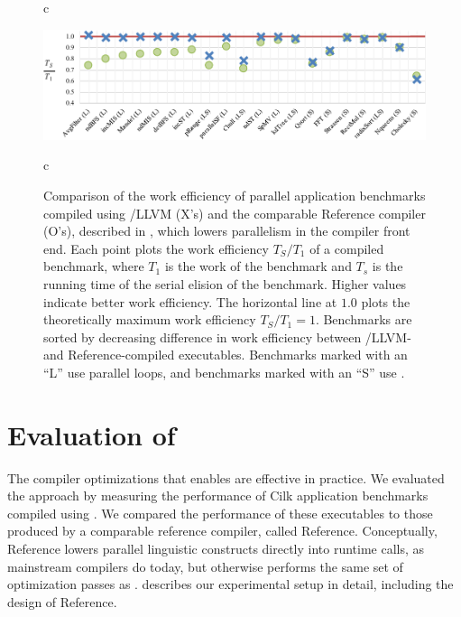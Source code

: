 \begin{figure}[t]
\begin{tab}{c}

\toprule
\end{tab}
  \begin{flushleft}
      \includegraphics[width=\linewidth]{figures/workeff_scatter.pdf}
  \end{flushleft}
  \vspace*{-5mm}
  \begin{tab}{c}
  \bottomrule
 \end{tab}
 \caption[Graph of work efficiency comparison between Reference and Tapir/LLVM.]{Comparison of the work efficiency of
   \protect{} parallel application benchmarks
   compiled using \tapir/LLVM (X's) and the comparable Reference
   compiler (O's), described in , which lowers
   parallelism in the compiler front end.  Each point plots the work
   efficiency $T_S/T_1$ of a compiled benchmark, where $T_1$ is the
   work of the benchmark and $T_s$ is the running time of the serial
   elision of the benchmark.  Higher values indicate better work
   efficiency.  The horizontal line at $1.0$ plots the theoretically
   maximum work efficiency $T_S/T_1 = 1$.  Benchmarks are sorted by
   decreasing difference in work efficiency between \tapir/LLVM- and
   Reference-compiled executables.  Benchmarks marked with an ``L''
   use parallel loops, and benchmarks marked with an ``S'' use
   \CilkSpawn.}
  \label{fig:work_efficiency}
\end{figure}

\section{Evaluation of \tapirllvm}

The compiler optimizations that \tapir enables are effective in
practice.  We evaluated the \tapir approach by measuring the
performance of  Cilk application benchmarks
compiled using \tapirllvm.  We compared the performance of these
executables to those produced by a comparable reference compiler,
called Reference.  Conceptually, Reference lowers parallel linguistic
constructs directly into runtime calls, as mainstream compilers do
today, but otherwise performs the same set of optimization passes as
\tapirllvm.   describes our experimental setup in detail,
including the design of Reference.

